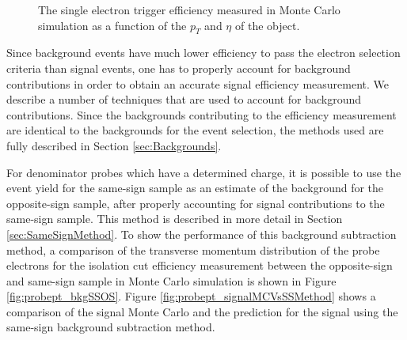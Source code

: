 \documentclass{cmspaper}
\begin{document}
\begin{figure}[htb]
  \begin{center}
    \caption{The single electron trigger efficiency measured in Monte Carlo simulation as a function of the $p_{T}$ and $\eta$ of the object. }
    \label{fig:SingleElectronTriggerEfficiency_JetTriggerMethod}
  \end{center}
\end{figure}


\label{sec:TagAndProbeBackground}
Since background events have much lower efficiency to pass the electron selection criteria than signal events, one has to properly account for background contributions in order to obtain an accurate signal efficiency measurement. We describe a number of techniques that are used to account for background contributions. Since the backgrounds contributing to the efficiency measurement are identical to the backgrounds for the \Z\To\Ep\Em event selection, the methods used are fully described in Section \ref{sec:Backgrounds}. 

\label{sec:SameSignMethodForEfficiency}
For denominator probes which have a determined charge, it is possible to use the event yield for the same-sign sample as an estimate of the background for the opposite-sign sample, after properly accounting for signal contributions to the same-sign sample. This method is described in more detail in Section \ref{sec:SameSignMethod}.  To show the performance of this background subtraction method, a comparison of the transverse momentum distribution of the probe electrons for the isolation cut efficiency measurement between the opposite-sign and same-sign sample in Monte Carlo simulation is shown in Figure \ref{fig:probept_bkgSSOS}. Figure \ref{fig:probept_signalMCVsSSMethod} shows a comparison of the signal Monte Carlo and the prediction for the signal using the same-sign background subtraction method.
\end{document}
